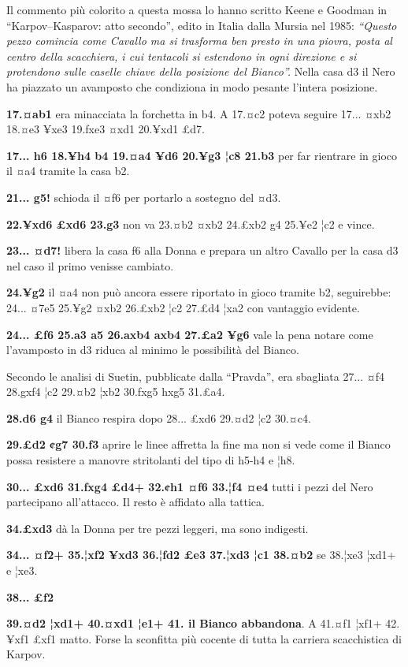 
Il commento più colorito a questa mossa lo hanno scritto Keene e Goodman
in ``Karpov--Kasparov: atto secondo'', edito in Italia dalla Mursia nel
1985: \emph{``Questo pezzo comincia come Cavallo ma si trasforma ben
presto in una piovra, posta al centro della scacchiera, i cui tentacoli
si estendono in ogni direzione e si protendono sulle caselle chiave
della posizione del Bianco''.} Nella casa d3 il Nero ha piazzato un
avamposto che condiziona in modo pesante l'intera posizione.

\textbf{17.¤ab1} era minacciata la forchetta in b4. A 17.¤c2 poteva
seguire 17... ¤xb2 18.¤e3 ¥xe3 19.fxe3 ¤xd1 20.¥xd1 £d7.

\textbf{17... h6 18.¥h4 b4 19.¤a4 ¥d6 20.¥g3 ¦c8 21.b3} per far
rientrare in gioco il ¤a4 tramite la casa b2.

\textbf{21... g5!} schioda il ¤f6 per portarlo a sostegno del ¤d3.

\textbf{22.¥xd6 £xd6 23.g3} non va 23.¤b2 ¤xb2 24.£xb2 g4 25.¥e2 ¦c2 e
vince.

\textbf{23... ¤d7!} libera la casa f6 alla Donna e prepara un altro
Cavallo per la casa d3 nel caso il primo venisse cambiato.

\textbf{24.¥g2} il ¤a4 non può ancora essere riportato in gioco tramite
b2, seguirebbe: 24... ¤7e5 25.¥g2 ¤xb2 26.£xb2 ¦c2 27.£d4 ¦xa2 con
vantaggio evidente.

\textbf{24... £f6 25.a3 a5 26.axb4 axb4 27.£a2 ¥g6} vale la pena notare
come l'avamposto in d3 riduca al minimo le possibilità del Bianco.

Secondo le analisi di Suetin, pubblicate dalla ``Pravda'', era sbagliata
27... ¤f4 28.gxf4 ¦c2 29.¤b2 ¦xb2 30.fxg5 hxg5 31.£a4.

\textbf{28.d6 g4} il Bianco respira dopo 28... £xd6 29.¤d2 ¦c2 30.¤c4.

\textbf{29.£d2 ¢g7 30.f3} aprire le linee affretta la fine ma non si
vede come il Bianco possa resistere a manovre stritolanti del tipo di
h5-h4 e ¦h8.

\textbf{30... £xd6 31.fxg4 £d4+ 32.¢h1 ¤f6 33.¦f4 ¤e4} tutti i pezzi del
Nero partecipano all'attacco. Il resto è affidato alla tattica.

\textbf{34.£xd3} dà la Donna per tre pezzi leggeri, ma sono indigesti.

\textbf{34... ¤f2+ 35.¦xf2 ¥xd3 36.¦fd2 £e3 37.¦xd3 ¦c1 38.¤b2} se
38.¦xe3 ¦xd1+ e ¦xe3.

\textbf{38... £f2}


\textbf{39.¤d2 ¦xd1+ 40.¤xd1 ¦e1+ 41. il Bianco abbandona}. A 41.¤f1
¦xf1+ 42.¥xf1 £xf1 matto. Forse la sconfitta più cocente di tutta la
carriera scacchistica di Karpov.
